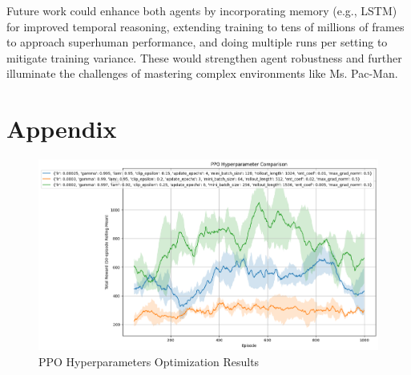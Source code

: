 \documentclass{article}
\begin{document}
Future work could enhance both agents by incorporating memory (e.g., LSTM) for improved temporal reasoning, extending training to tens of millions of frames to approach superhuman performance, and doing multiple runs per setting to mitigate training variance. These would strengthen agent robustness and further illuminate the challenges of mastering complex environments like Ms. Pac-Man.

\appendix
\section{Appendix}
\label{sec:appendix}

\begin{figure}[htbp]
  \centering
  \includegraphics[width=\linewidth]{PPO_output_hyperparameters_3set.png}
  \caption{PPO Hyperparameters Optimization Results}
  \label{fig:ppo_hyperparams}
\end{figure}
\end{document}
